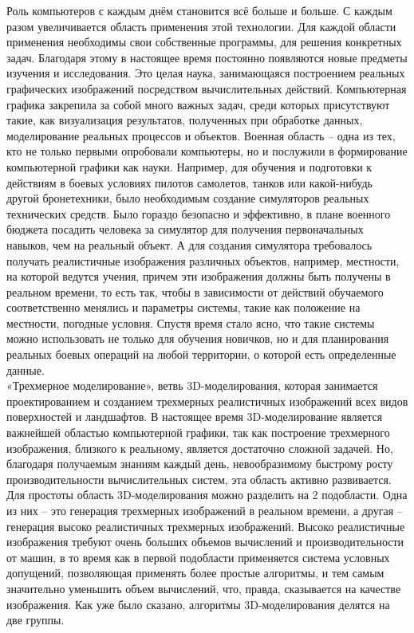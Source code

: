 \documentclass[a4paper, 10pt]{article}
\begin{document}
	\hspace*{5mm}Роль компьютеров с каждым днём становится всё больше и больше. С каждым разом увеличивается область применения этой технологии. Для каждой области применения необходимы свои собственные программы, для решения конкретных задач. Благодаря этому в настоящее время постоянно появляются новые предметы изучения и исследования. Это целая наука, занимающаяся построением реальных графических изображений посредством вычислительных действий. Компьютерная графика закрепила за собой много важных задач, среди которых присутствуют такие, как визуализация результатов, полученных при обработке данных, моделирование реальных процессов и объектов. Военная область – одна из тех, кто не только первыми опробовали компьютеры, но и послужили в формирование компьютерной графики как науки. Например, для обучения и подготовки к действиям в боевых условиях пилотов самолетов, танков или какой-нибудь другой бронетехники, было необходимым создание симуляторов реальных технических средств. Было гораздо безопасно и эффективно, в плане военного бюджета посадить человека за симулятор для получения первоначальных навыков, чем на реальный объект. А для создания симулятора требовалось получать реалистичные изображения различных объектов, например, местности, на которой ведутся учения, причем эти изображения должны быть получены в реальном времени, то есть так, чтобы в зависимости от действий обучаемого соответственно менялись и параметры системы, такие как положение на местности, погодные условия. Спустя время стало ясно, что такие системы можно использовать не только для обучения новичков, но и для планирования реальных боевых операций на любой территории, о которой есть определенные данные.
	\\ \hspace*{5mm}«Трехмерное моделирование», ветвь 3D-моделирования, которая занимается проектированием и созданием трехмерных реалистичных изображений всех видов поверхностей и ландшафтов. 
	В настоящее время 3D-моделирование является важнейшей областью компьютерной графики, так как построение трехмерного изображения, близкого к реальному, является достаточно сложной задачей. Но, благодаря получаемым знаниям каждый день, невообразимому быстрому росту производительности вычислительных систем, эта область активно развивается.
	\\ \hspace*{5mm}Для простоты область 3D-моделирования можно разделить на 2 подобласти. Одна из них – это генерация трехмерных изображений в реальном времени, а другая – генерация высоко реалистичных трехмерных изображений. Высоко реалистичные изображения требуют очень больших объемов вычислений и производительности от машин, в то время как в первой подобласти применяется система условных допущений, позволяющая применять более простые алгоритмы, и тем самым значительно уменьшить объем вычислений, что, правда, сказывается на качестве изображения. Как уже было сказано, алгоритмы 3D-моделирования делятся на две группы.
\end{document}

